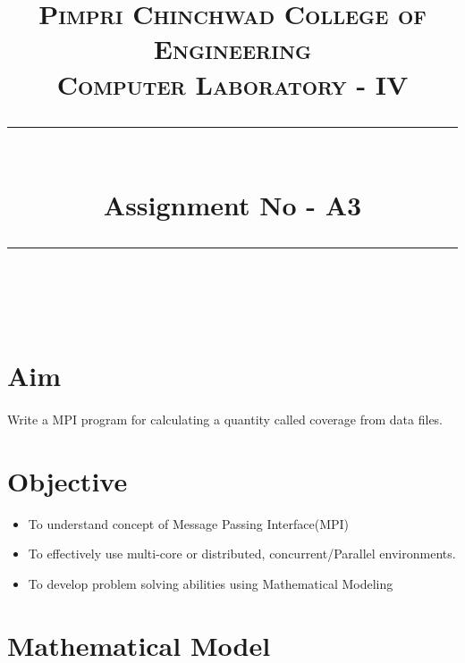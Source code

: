\documentclass[a4paper,12pt]{article}
\title{
	\normalfont \normalsize 
	\textsc{Pimpri Chinchwad College of Engineering \\ 
		Computer Laboratory - IV} \\
	[10pt] 
	\rule{\linewidth}{0.5pt} \\[6pt] 
	\huge Assignment No - A3 \\
	\rule{\linewidth}{2pt}  \\[10pt]
}
\author{}
\date{\normalsize}
\newenvironment{codefont}{\fontfamily{ccr}\selectfont}{\par}
\begin{document}
\maketitle

\section{Aim}
	\paragraph{} Write a MPI program for calculating a quantity called coverage from data files.
	
\section{Objective}
	\begin{itemize}
		\item To understand concept of Message Passing Interface(MPI) 
		\item	To effectively use multi-core or distributed, concurrent/Parallel environments.  
		\item	To develop problem solving abilities using Mathematical Modeling 
		
	\end{itemize}
	
\section{Mathematical Model}
	
\end{document}
